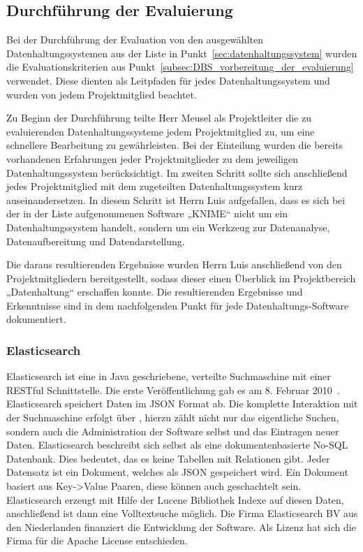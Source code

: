 \subsection{Durchführung der Evaluierung}
\label{subsec:durchfuehrung_der_evaluierung}
Bei der Durchführung der Evaluation von den ausgewählten Datenhaltungssystemen
aus der Liste in Punkt~\ref{sec:datenhaltungssystem} wurden die
Evaluationskriterien aus Punkt~\ref{subsec:DBS_vorbereitung_der_evaluierung}
verwendet. Diese dienten als Leitpfaden für jedes Datenhaltungssystem und
wurden von jedem Projektmitglied beachtet.

Zu Beginn der Durchführung teilte Herr Meusel als Projektleiter die zu
evaluierenden Datenhaltungssysteme jedem Projektmitglied zu, um eine schnellere
Bearbeitung zu gewährleisten. Bei der Einteilung wurden die bereits vorhandenen
Erfahrungen jeder Projektmitglieder zu dem jeweiligen Datenhaltungssystem
berücksichtigt. Im zweiten Schritt sollte sich anschließend jedes
Projektmitglied mit dem zugeteilten Datenhaltungssystem kurz auseinandersetzen.
In diesem Schritt ist Herrn Luis aufgefallen, dass es sich bei der in der Liste
aufgenommenen Software „KNIME“ nicht um ein Datenhaltungssystem handelt,
sondern um ein Werkzeug zur Datenanalyse, Datenaufbereitung und
Datendarstellung.

Die daraus resultierenden Ergebnisse wurden Herrn Luis anschließend von den
Projektmitgliedern bereitgestellt, sodass dieser einen Überblick im
Projektbereich „Datenhaltung“ erschaffen konnte. Die resultierenden
Ergebnisse und Erkenntnisse sind in dem nachfolgenden Punkt für jede
Datenhaltungs-Software dokumentiert.
\nl%

\subsubsection{Elasticsearch}
\label{subsubsec:elasticsearch}
Elasticsearch ist eine in Java geschriebene, verteilte Suchmaschine mit einer
\gls{RESTful} Schnittstelle. Die erste Veröffentlichung gab es am 8. Februar
2010~\cite{es_release}. Elasticsearch speichert Daten im \gls{JSON} Format ab.
Die komplette Interaktion mit der Suchmaschine erfolgt über
, hierzu zählt nicht nur das eigentliche Suchen, sondern
auch die Administration der Software selbst und das Eintragen neuer Daten.
Elasticsearch beschreibt sich selbst als eine dokumentenbasierte No-SQL
Datenbank. Dies bedeutet, das es keine Tabellen mit Relationen gibt. Jeder
Datensatz ist ein Dokument, welches als \gls{JSON} gespeichert wird. Ein
Dokument basiert aus Key->Value Paaren, diese können auch geschachtelt sein.
Elasticsearch erzeugt mit Hilfe der \gls{Lucene} Bibliothek Indexe auf diesen
Daten, anschließend ist dann eine Volltextsuche möglich. Die Firma
Elasticsearch BV aus den Niederlanden finanziert die Entwicklung der
Software. Als Lizenz hat sich die Firma für die Apache License entschieden.

